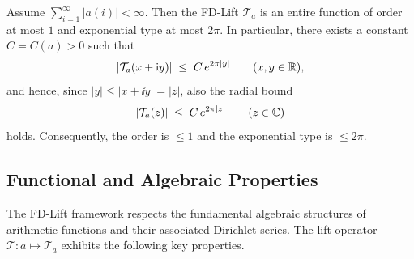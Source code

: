 \FloatBarrier 

\begin{corollary}
Assume $\sum_{i=1}^{\infty} |a(i)| < \infty$. Then the FD-Lift $\mathcal{T}_a$ is an entire function of order at most $1$ and exponential type at most $2\pi$. In particular, there exists a constant $C=C(a)>0$ such that
\[
|\mathcal{T}_a(x+\mathrm{i} y)| \;\le\; C\, e^{2\pi |y|} \qquad (x,y\in\mathbb{R}),
\]
and hence, since $|y|\le |x+\ii y|=|z|$, also the radial bound
\[
|\mathcal{T}_a(z)| \;\le\; C\, e^{2\pi |z|} \qquad (z\in\mathbb{C})
\]
holds. Consequently, the order is $\le 1$ and the exponential type is $\le 2\pi$.
\end{corollary}


\subsection{Functional and Algebraic Properties}

The FD-Lift framework respects the fundamental algebraic structures of arithmetic functions and their associated Dirichlet series. The lift operator $\mathcal{T}: a \mapsto \mathcal{T}_a$ exhibits the following key properties.

